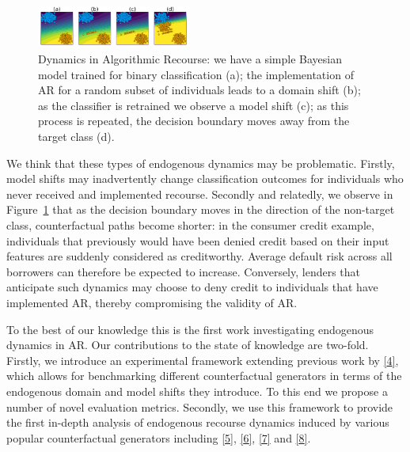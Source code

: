 \documentclass[
  conference]{IEEEtran}
\begin{document}
\begin{figure}

{\centering \includegraphics[width=0.45\textwidth,height=\textheight]{www/poc.png}

}

\caption{\label{fig-poc}Dynamics in Algorithmic Recourse: we have a
simple Bayesian model trained for binary classification (a); the
implementation of AR for a random subset of individuals leads to a
domain shift (b); as the classifier is retrained we observe a model
shift (c); as this process is repeated, the decision boundary moves away
from the target class (d).}

\end{figure}

We think that these types of endogenous dynamics may be problematic.
Firstly, model shifts may inadvertently change classification outcomes
for individuals who never received and implemented recourse. Secondly
and relatedly, we observe in Figure~\ref{fig-poc} that as the decision
boundary moves in the direction of the non-target class, counterfactual
paths become shorter: in the consumer credit example, individuals that
previously would have been denied credit based on their input features
are suddenly considered as creditworthy. Average default risk across all
borrowers can therefore be expected to increase. Conversely, lenders
that anticipate such dynamics may choose to deny credit to individuals
that have implemented AR, thereby compromising the validity of AR.

To the best of our knowledge this is the first work investigating
endogenous dynamics in AR. Our contributions to the state of knowledge
are two-fold. Firstly, we introduce an experimental framework extending
previous work by \protect\hyperlink{ref-pawelczyk2021carla}{{[}4{]}},
which allows for benchmarking different counterfactual generators in
terms of the endogenous domain and model shifts they introduce. To this
end we propose a number of novel evaluation metrics. Secondly, we use
this framework to provide the first in-depth analysis of endogenous
recourse dynamics induced by various popular counterfactual generators
including \protect\hyperlink{ref-wachter2017counterfactual}{{[}5{]}},
\protect\hyperlink{ref-joshi2019towards}{{[}6{]}},
\protect\hyperlink{ref-mothilal2020explaining}{{[}7{]}} and
\protect\hyperlink{ref-antoran2020getting}{{[}8{]}}.
\end{document}
